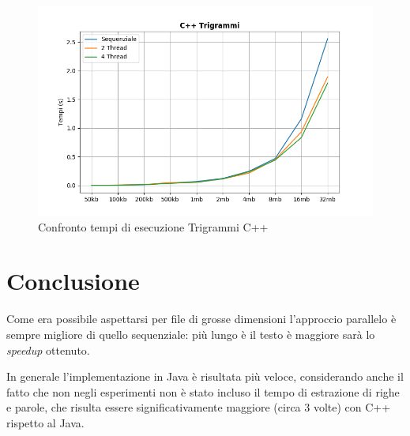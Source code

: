 \documentclass[10pt,twocolumn,letterpaper]{article}
\begin{document}
\begin{figure}[h]
\includegraphics[width=\linewidth]{Plots/tempi_cpp_trigrammi.png}
\caption{Confronto tempi di esecuzione Trigrammi C++}
\end{figure}

\section{Conclusione}
Come era possibile aspettarsi per file di grosse dimensioni l'approccio parallelo è sempre migliore di quello sequenziale: più lungo è il testo è maggiore sarà lo \textit{speedup} ottenuto.

In generale l'implementazione in Java è risultata più veloce, considerando anche il fatto che non negli esperimenti non è stato incluso il tempo di estrazione di righe e parole, che risulta essere significativamente maggiore (circa 3 volte) con C++ rispetto al Java.

{


}
\end{document}
